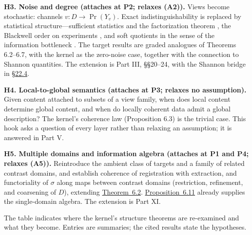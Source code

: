 \textbf{H3. Noise and degree (attaches at P2; relaxes (A2)).} Views become stochastic: channels \(v : D \to \Pr(Y_v)\). Exact indistinguishability is replaced by statistical structure---\hspace{0pt}sufficient statistics and the factorization theorem \autocite{halmos1949}, the Blackwell order on experiments \autocite{blackwell1951,blackwell1953}, and soft quotients in the sense of the information bottleneck \autocite{tishby1999}. The target results are graded analogues of Theorems 6.2--6.7, with the kernel as the zero-noise case, together with the connection to Shannon quantities. The extension is Part III, §§20--24, with the Shannon bridge in \hyperlink{sec:22.4}{§22.4}.

\textbf{H4. Local-to-global semantics (attaches at P3; relaxes no assumption).} Given content attached to subsets of a view family, when does local content determine global content, and when do locally coherent data admit a global description? The kernel's coherence law (Proposition 6.3) is the trivial case. This hook asks a question of every layer rather than relaxing an assumption; it is answered in Part V.

\textbf{H5. Multiple domains and information algebra (attaches at P1 and P4; relaxes (A5)).} Reintroduce the ambient class of targets and a family of related contrast domains, and establish coherence of registration with extraction, and functoriality of \(\sigma\) along maps between contrast domains (restriction, refinement, and coarsening of \(D\)), extending \hyperlink{stmt:6.2}{Theorem~6.2}. \hyperlink{stmt:6.11}{Proposition~6.11} already supplies the single-domain algebra. The extension is Part XI.


The table indicates where the kernel's structure theorems are re-examined and what they become. Entries are summaries; the cited results state the hypotheses.

